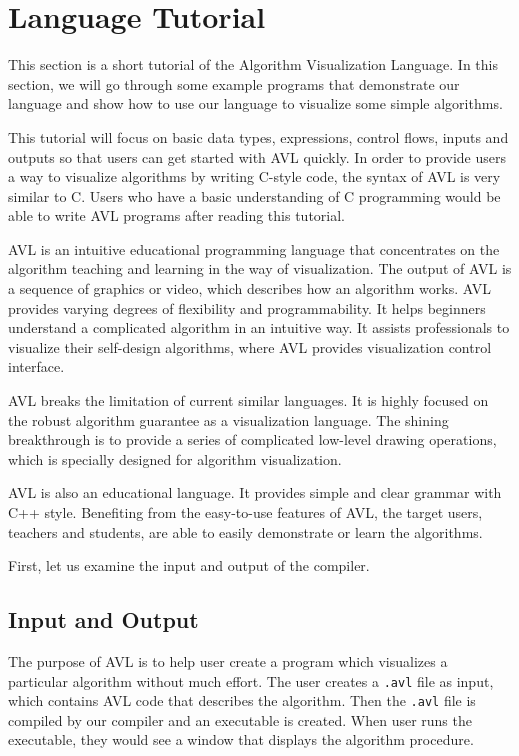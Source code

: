 \section{Language Tutorial}

This section is a short tutorial of the Algorithm Visualization Language. In this section, we will
go through some example programs that demonstrate our language and show how to use our language to
visualize some simple algorithms.

This tutorial will focus on basic data types, expressions, control flows, inputs and outputs so that
users can get started with AVL quickly. In order to provide users a way to visualize algorithms by
writing C-style code, the syntax of AVL is very similar to C. Users who have a basic understanding
of C programming would be able to write AVL programs after reading this tutorial.

AVL is an intuitive educational programming language that concentrates on the algorithm teaching and
learning in the way of visualization. The output of AVL is a sequence of graphics or video, which
describes how an algorithm works. AVL provides varying degrees of flexibility and programmability.
It helps beginners understand a complicated algorithm in an intuitive way. It assists professionals
to visualize their self-design algorithms, where AVL provides visualization control interface.

AVL breaks the limitation of current similar languages. It is highly focused on the robust algorithm
guarantee as a visualization language. The shining breakthrough is to provide a series of
complicated low-level drawing operations, which is specially designed for algorithm visualization.

AVL is also an educational language. It provides simple and clear grammar with C++ style. Benefiting
from the easy-to-use features of AVL, the target users, teachers and students, are able to easily
demonstrate or learn the algorithms.

First, let us examine the input and output of the compiler.

\subsection{Input and Output}

The purpose of AVL is to help user create a program which visualizes a particular algorithm without
much effort. The user creates a \verb".avl" file as input, which contains AVL code that describes
the algorithm. Then the \verb".avl" file is compiled by our compiler and an executable is created.
When user runs the executable, they would see a window that displays the algorithm procedure.

